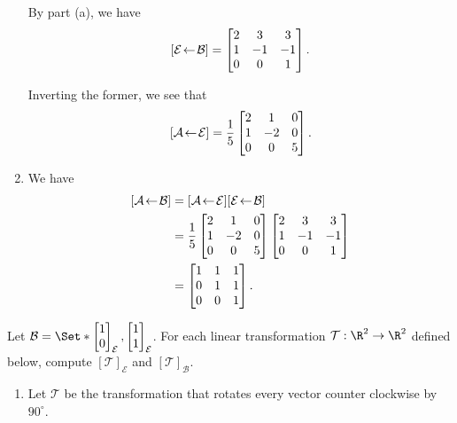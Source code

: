 \begin{exercises}
\begin{problist}
\begin{solution}
\begin{enumerate}
				By part (a), we have
				\[
					\BasisChange{\mathcal B}{\mathcal E}=
					\begin{bmatrix}
						2 & 3 & 3\\
						1 & -1 & -1\\
						0 & 0 & 1
					\end{bmatrix}.
				\]
				
				Inverting the former, we see that
				\[
					\BasisChange{\mathcal E}{\mathcal A}=\frac{1}{5}
					\begin{bmatrix}
						2 & 1 & 0\\
						1 & -2 & 0\\
						0 & 0 & 5
					\end{bmatrix}.
				\]
				\item We have
				\[
					\begin{aligned}
						\BasisChange{\mathcal B}{\mathcal A}
						&=\BasisChange{\mathcal E}{\mathcal A}\BasisChange{\mathcal B}{\mathcal E}\\
						&=\frac{1}{5}
						\begin{bmatrix}
							2 & 1 & 0\\
							1 & -2 & 0\\
							0 & 0 & 5
						\end{bmatrix}
						\begin{bmatrix}
							2 & 3 & 3\\
							1 & -1 & -1\\
							0 & 0 & 1
						\end{bmatrix}\\
						&=
						\begin{bmatrix}
							1 & 1 & 1\\
							0 & 1 & 1\\
							0 & 0 & 1
						\end{bmatrix}.
					\end{aligned}
				\]
			\end{enumerate}
		\end{solution}
		\prob Let $\mathcal B=\Set*{\mat{1\\0}_{\mathcal E},\mat{1\\1}_{\mathcal E}}$.
		For each linear transformation
		$\mathcal T:\R^{2}\to\R^{2}$ defined below, compute
		$[\mathcal T]_{\mathcal E}$ and $[\mathcal T]_{\mathcal B}$.
		\begin{enumerate}
			\item Let $\mathcal T$ be the transformation that rotates
				every vector counter clockwise by $90^{\circ}$.


\end{enumerate}
\end{problist}
\end{exercises}
